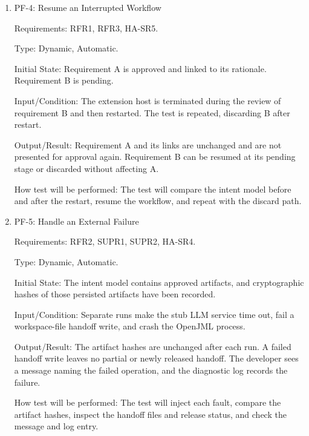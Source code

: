 \documentclass[12pt, titlepage]{article}
\begin{document}
\begin{enumerate}
Output/Result: The first revision removes PDF export. The second keeps that
change and adds column headings. The terminated proposal is not recorded as
approved.

How test will be performed: The tester will compare each revision with all
feedback given so far, then inspect the intent model after termination.

\item{PF-4: Resume an Interrupted Workflow\\}

Requirements: RFR1, RFR3, HA-SR5.

Type: Dynamic, Automatic.

Initial State: Requirement A is approved and linked to its rationale.
Requirement B is pending.

Input/Condition: The extension host is terminated during the review of
requirement B and then restarted. The test is repeated, discarding B after
restart.

Output/Result: Requirement A and its links are unchanged and are not presented
for approval again. Requirement B can be resumed at its pending stage or
discarded without affecting A.

How test will be performed: The test will compare the intent model before and
after the restart, resume the workflow, and repeat with the discard path.

\item{PF-5: Handle an External Failure\\}

Requirements: RFR2, SUPR1, SUPR2, HA-SR4.

Type: Dynamic, Automatic.

Initial State: The intent model contains approved artifacts, and cryptographic
hashes of those persisted artifacts have been recorded.

Input/Condition: Separate runs make the stub LLM service time out, fail a
workspace-file handoff write, and crash the OpenJML process.

Output/Result: The artifact hashes are unchanged after each run. A failed handoff
write leaves no partial or newly released handoff. The developer sees a message
naming the failed operation, and the diagnostic log records the failure.

How test will be performed: The test will inject each fault, compare the artifact
hashes, inspect the handoff files and release status, and check the message and
log entry.


\end{enumerate}
\end{document}
